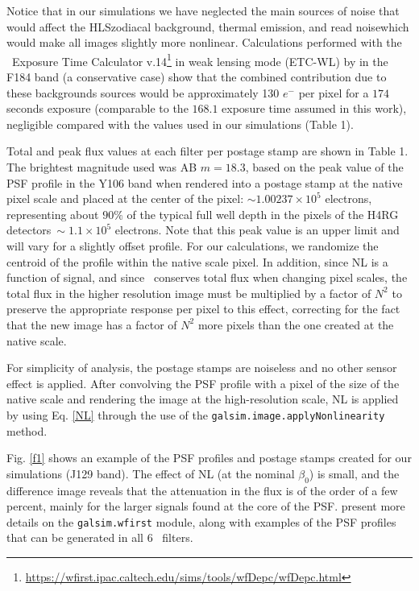 \documentclass[11pt,preprint,flushrt]{aastex}
\begin{document}
Notice that in our simulations we have neglected the main sources of noise that would affect the HLS\textemdash zodiacal background, thermal emission, and read noise\textemdash which would make all images slightly more nonlinear. Calculations performed with the \wfa\ Exposure Time Calculator v.14\footnote{\url{https://wfirst.ipac.caltech.edu/sims/tools/wfDepc/wfDepc.html}} \citep{hirata12} in weak lensing mode (ETC-WL) by \citealt{spergel15} in the F184 band (a conservative case) show that the combined contribution due to these backgrounds sources would be approximately 130 $e^-$ per pixel for a $174$ seconds exposure (comparable to the $168.1$ exposure time assumed in this work), negligible compared with the values used in our simulations (Table 1).

Total and peak flux values at each filter per postage stamp are shown in Table 1. The brightest magnitude used was AB $m=18.3$, based on the peak value of the PSF profile in the Y106 band when rendered into a postage stamp at the native pixel scale and placed at the center of the pixel: $\sim 1.00237\times10^{5}$ electrons, representing about $90\%$ of the typical full well depth in the pixels of the H4RG detectors\textemdash$\ \sim1.1\times10^{5}$ electrons. Note that this peak value is an upper limit and will vary for a slightly offset profile. For our calculations, we randomize the centroid of the profile within the native scale pixel. In addition, since NL is a function of signal, and since \gs\ conserves total flux when changing pixel scales, the total flux in the higher resolution image must be multiplied by a factor of $N^2$ to preserve the appropriate response per pixel to this effect, correcting for the fact that the new image has a factor of $N^2$ more pixels than the one created at the native scale. 

For simplicity of analysis, the postage stamps are noiseless and no other sensor effect is applied. After convolving the PSF profile with a pixel of the size of the native scale and rendering the image at the high-resolution scale, NL is applied by using Eq. \ref{NL} through the use of the {\tt{galsim.image.applyNonlinearity}} method. 

Fig. \ref{f1} shows an example of the PSF profiles and postage stamps created for our simulations (J129 band). The effect of NL (at the nominal $\beta_0$) is small, and the difference image reveals that the attenuation in the flux is of the order of a few percent, mainly for the larger signals found at the core of the PSF.  \citealt{kannawadi15} present more details on the {\tt{galsim.wfirst}} module, along with examples of the PSF profiles that can be generated in all 6 \wfa\ filters. 
\end{document}
